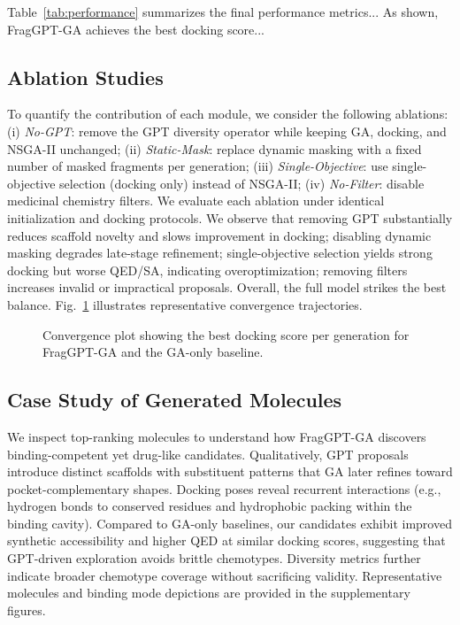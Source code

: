 \documentclass[lettersize,journal]{IEEEtran}
\begin{document}
Table~\ref{tab:performance} summarizes the final performance metrics... As shown, FragGPT-GA achieves the best docking score...
\subsection{Ablation Studies}
To quantify the contribution of each module, we consider the following ablations: (i) \textit{No-GPT}: remove the GPT diversity operator while keeping GA, docking, and NSGA-II unchanged; (ii) \textit{Static-Mask}: replace dynamic masking with a fixed number of masked fragments per generation; (iii) \textit{Single-Objective}: use single-objective selection (docking only) instead of NSGA-II; (iv) \textit{No-Filter}: disable medicinal chemistry filters. We evaluate each ablation under identical initialization and docking protocols. We observe that removing GPT substantially reduces scaffold novelty and slows improvement in docking; disabling dynamic masking degrades late-stage refinement; single-objective selection yields strong docking but worse QED/SA, indicating overoptimization; removing filters increases invalid or impractical proposals. Overall, the full model strikes the best balance. Fig.~\ref{fig:convergence} illustrates representative convergence trajectories.
\begin{figure}[!t]
\centering
\caption{Convergence plot showing the best docking score per generation for FragGPT-GA and the GA-only baseline.}
\label{fig:convergence}
\end{figure}
\subsection{Case Study of Generated Molecules}
We inspect top-ranking molecules to understand how FragGPT-GA discovers binding-competent yet drug-like candidates. Qualitatively, GPT proposals introduce distinct scaffolds with substituent patterns that GA later refines toward pocket-complementary shapes. Docking poses reveal recurrent interactions (e.g., hydrogen bonds to conserved residues and hydrophobic packing within the binding cavity). Compared to GA-only baselines, our candidates exhibit improved synthetic accessibility and higher QED at similar docking scores, suggesting that GPT-driven exploration avoids brittle chemotypes. Diversity metrics further indicate broader chemotype coverage without sacrificing validity. Representative molecules and binding mode depictions are provided in the supplementary figures.
\end{document}

